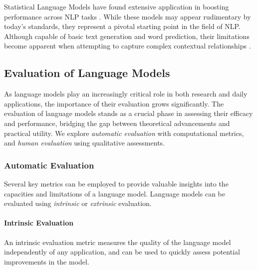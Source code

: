 
Statistical Language Models have found extensive application in boosting performance across \ac{NLP} tasks \citep{bahl1989tree, thede1999second}. While these models may appear rudimentary by today's standards, they represent a pivotal starting point in the field of \ac{NLP}. Although capable of basic text generation and word prediction, their limitations become apparent when attempting to capture complex contextual relationships \citep{rosenfeld2000two, arisoy2012deep}.


\subsection{Evaluation of Language Models}

As language models play an increasingly critical role in both research and daily applications, the importance of their evaluation grows significantly. The evaluation of language models stands as a crucial phase in assessing their efficacy and performance, bridging the gap between theoretical advancements and practical utility. We explore \textit{automatic evaluation} with computational metrics, and \textit{human evaluation} using qualitative assessments. 

\subsubsection{Automatic Evaluation} 

Several key metrics can be employed to provide valuable insights into the capacities and limitations of a language model. Language models can be evaluated using \textit{intrinsic} or \textit{extrinsic} evaluation. 

\paragraph{Intrinsic Evaluation} An intrinsic evaluation metric measures the quality of the language model independently of any application, and can be used to quickly assess potential improvements in the model.

